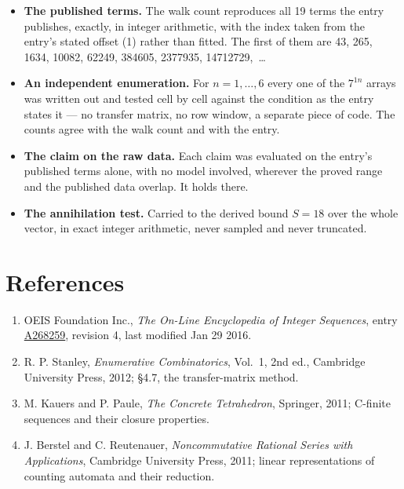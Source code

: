 \documentclass[11pt]{article}
\theoremstyle{definition}
\begin{document}
\begin{itemize}

\item {\bfseries The published terms.} The walk count reproduces all 19 terms the entry publishes, exactly, in integer arithmetic, with the index taken from the entry's stated offset (1) rather than fitted. The first of them are 43, 265, 1634, 10082, 62249, 384605, 2377935, 14712729,~\dots

\item {\bfseries An independent enumeration.} For $n = 1,\dots,6$ every one of the $7^{1n}$ arrays was written out and tested cell by cell against the condition as the entry states it --- no transfer matrix, no row window, a separate piece of code. The counts agree with the walk count and with the entry.

\item {\bfseries The claim on the raw data.} Each claim was evaluated on the entry's published terms alone, with no model involved, wherever the proved range and the published data overlap. It holds there.

\item {\bfseries The annihilation test.} Carried to the derived bound $S = 18$ over the whole vector, in exact integer arithmetic, never sampled and never truncated.

\end{itemize}

\section{References}

\begin{enumerate}

\item OEIS Foundation Inc., \emph{The On-Line Encyclopedia of Integer Sequences}, entry \href{https://oeis.org/A268259}{A268259}, revision 4, last modified Jan 29 2016.

\item R. P. Stanley, \emph{Enumerative Combinatorics}, Vol.~1, 2nd ed., Cambridge University Press, 2012; \S4.7, the transfer-matrix method.

\item M. Kauers and P. Paule, \emph{The Concrete Tetrahedron}, Springer, 2011; C-finite sequences and their closure properties.

\item J. Berstel and C. Reutenauer, \emph{Noncommutative Rational Series with Applications}, Cambridge University Press, 2011; linear representations of counting automata and their reduction.

\end{enumerate}
\end{document}
